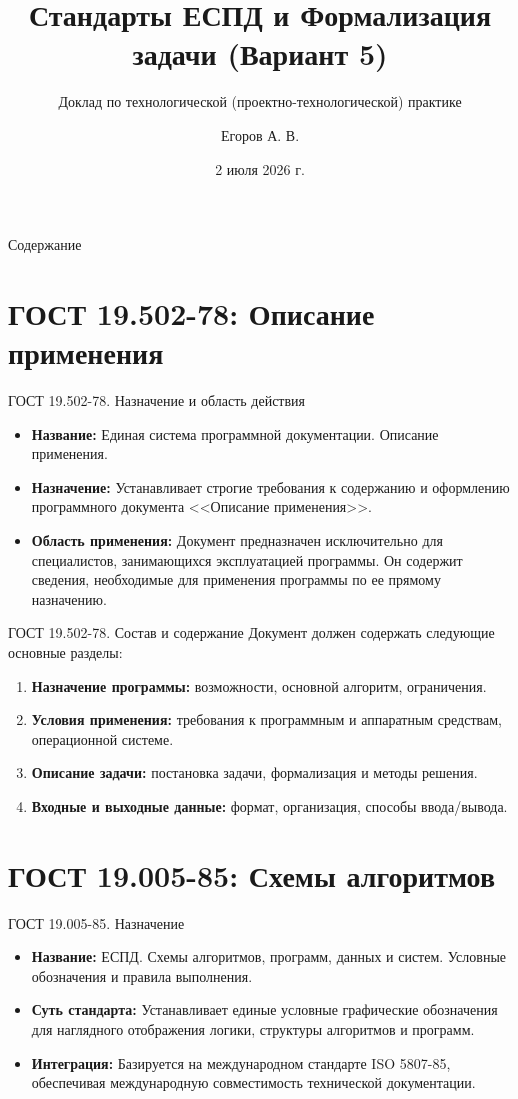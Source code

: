 \documentclass[10pt]{beamer}
\title[ЕСПД и Формализация]{Стандарты ЕСПД и Формализация задачи (Вариант 5)}
\subtitle{Доклад по технологической (проектно-технологической) практике}
\author{Егоров А. В.}
\institute[МАИ]{МАИ, Кафедра 304, Группа М3О-225БВ-24}
\date{2 июля 2026 г.}
\begin{document}
\frame{\titlepage}

\begin{frame}{Содержание}
    \tableofcontents
\end{frame}

\section{ГОСТ 19.502-78: Описание применения}

\begin{frame}{ГОСТ 19.502-78. Назначение и область действия}
    \begin{itemize}
        \item \textbf{Название:} Единая система программной документации. Описание применения.
        \item \textbf{Назначение:} Устанавливает строгие требования к содержанию и оформлению программного документа <<Описание применения>>.
        \item \textbf{Область применения:} Документ предназначен исключительно для специалистов, занимающихся эксплуатацией программы. Он содержит сведения, необходимые для применения программы по ее прямому назначению.
    \end{itemize}
\end{frame}

\begin{frame}{ГОСТ 19.502-78. Состав и содержание}
    Документ должен содержать следующие основные разделы:
    \begin{enumerate}
        \item \textbf{Назначение программы:} возможности, основной алгоритм, ограничения.
        \item \textbf{Условия применения:} требования к программным и аппаратным средствам, операционной системе.
        \item \textbf{Описание задачи:} постановка задачи, формализация и методы решения.
        \item \textbf{Входные и выходные данные:} формат, организация, способы ввода/вывода.
    \end{enumerate}
\end{frame}

\section{ГОСТ 19.005-85: Схемы алгоритмов}

\begin{frame}{ГОСТ 19.005-85. Назначение}
    \begin{itemize}
        \item \textbf{Название:} ЕСПД. Схемы алгоритмов, программ, данных и систем. Условные обозначения и правила выполнения.
        \item \textbf{Суть стандарта:} Устанавливает единые условные графические обозначения для наглядного отображения логики, структуры алгоритмов и программ.
        \item \textbf{Интеграция:} Базируется на международном стандарте ISO 5807-85, обеспечивая международную совместимость технической документации.
    \end{itemize}
\end{frame}
\end{document}
